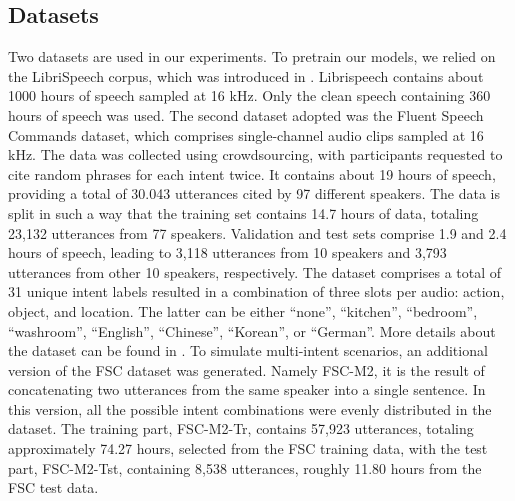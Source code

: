 \documentclass[a4paper]{article}
\begin{document}
\subsection{Datasets}

Two datasets are used in our experiments. To pretrain our models, we relied on the LibriSpeech corpus, which was introduced in \cite{panayotov2015librispeech}. Librispeech contains about 1000 hours of speech sampled at 16 kHz. Only the clean speech containing 360 hours of speech was used. The second dataset adopted was the Fluent Speech Commands dataset, which comprises single-channel audio clips sampled at 16 kHz. The data was collected using crowdsourcing, with participants requested to cite random phrases for each intent twice. It contains about 19 hours of speech, providing a total of 30.043 utterances cited by 97 different speakers. The data is split in such a way that the training set contains 14.7 hours of data, totaling 23,132 utterances from 77 speakers. Validation and test sets comprise 1.9 and 2.4 hours of speech, leading to 3,118 utterances from 10 speakers and 3,793 utterances from other 10 speakers, respectively. The dataset comprises a total of 31
unique intent labels resulted in a combination of three slots per audio: action, object, and location. The latter can be either “none”, “kitchen”, “bedroom”, “washroom”, “English”, “Chinese”, “Korean”, or “German”. More details about the dataset can be found in \cite{lugosch2019speech}. To simulate multi-intent scenarios, an additional version of the FSC dataset was generated. Namely FSC-M2, it is the result of concatenating two utterances from the same speaker into a single sentence. In this version, all the possible intent combinations were evenly distributed in the dataset. The training part, FSC-M2-Tr, contains 57,923 utterances, totaling approximately 74.27 hours, selected from the FSC training data, with the test part, FSC-M2-Tst, 
containing 8,538 utterances, roughly 11.80 hours from the FSC test data. 

\begin{table}
\centering
\caption{Experimental results on FSC for single-intent classification. Performance is reported in terms of accuracy (\%) for 31 intent targets.}
\label{tab:single_ce}
\end{table}
\end{document}
